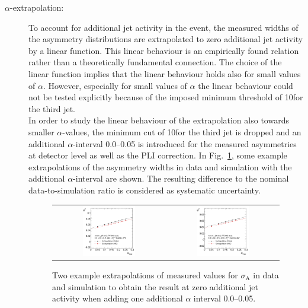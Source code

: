 \begin{description}
 \item[$\alpha$-extrapolation:] To account for additional jet activity in the event, the measured widths of the asymmetry distributions are extrapolated to zero additional jet activity by a linear function. This linear behaviour is an empirically found relation rather than a theoretically fundamental connection. The choice of the linear function implies that the linear behaviour holds also for small values of $\alpha$. However, especially for small values of $\alpha$ the linear behaviour could not be tested explicitly because of the imposed minimum \pt threshold of 10\gev for the third jet. \\
In order to study the linear behaviour of the extrapolation also towards smaller $\alpha$-values, the minimum \pt cut of 10\gev for the third jet is dropped and an additional $\alpha$-interval 0.0--0.05 is introduced for the measured asymmetries at detector level as well as the PLI correction. In Fig.~\ref{fig:syst_uncert_alpha_range}, some example extrapolations of the asymmetry widths in data and simulation with the additional $\alpha$-interval are shown. The resulting difference to the nominal data-to-simulation ratio is considered as systematic uncertainty.

\begin{figure}[!tp]
  \centering
  \begin{tabular}{cc}
                \includegraphics[width=0.49\textwidth]{figures/Extrapol_Eta0_pt4_final_nominal_NoMinPtCutForThirdJet_AddNewAlphaBin_v4.pdf} &
                \includegraphics[width=0.49\textwidth]{figures/Extrapol_Eta0_pt9_final_nominal_NoMinPtCutForThirdJet_AddNewAlphaBin_v4.pdf}
  \end{tabular}
  \caption{Two example extrapolations of measured values for $\sigma_\mathrm{A}$ in data and simulation to obtain the result at zero additional jet activity when adding one additional $\alpha$ interval 0.0--0.05.}
  \label{fig:syst_uncert_alpha_range}
\end{figure}


\end{description}
